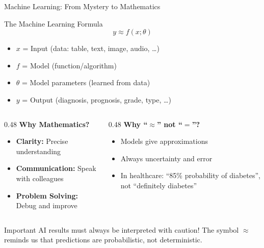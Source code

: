 \documentclass[aspectratio=169, 10pt]{beamer}
\begin{document}
\begin{frame}{Machine Learning: From Mystery to Mathematics}

    \begin{block}{\footnotesize The Machine Learning Formula}
        \footnotesize
        \[ y \approx f(x; \theta) \]
        \begin{itemize}
            \item $x$ = Input (data: table, text, image, audio, \ldots)
            \item $f$ = Model (function/algorithm)
            \item $\theta$ = Model parameters (learned from data)
            \item $y$ = Output (diagnosis, prognosis, grade, type, \ldots)
        \end{itemize}
    \end{block}

    \vspace{2mm}
    \begin{columns}
        \begin{column}{0.48\textwidth}
            \textbf{Why Mathematics?}
            \begin{itemize}
                \item \textbf{Clarity:} Precise understanding
                \item \textbf{Communication:} Speak with colleagues
                \item \textbf{Problem Solving:} Debug and improve
            \end{itemize}
        \end{column}

        \begin{column}{0.48\textwidth}
            \textbf{Why ``$\approx$'' not ``$=$''?}
            \begin{itemize}
                \item Models give approximations
                \item Always uncertainty and error
                \item In healthcare: ``85\% probability of diabetes'', not ``definitely diabetes''
            \end{itemize}
        \end{column}
    \end{columns}

    \vspace{2mm}
    \begin{alertblock}{\footnotesize Important}
        \footnotesize
        AI results must always be interpreted with caution! The symbol $\approx$ reminds us that predictions are probabilistic, not deterministic.
    \end{alertblock}

\end{frame}
\end{document}
